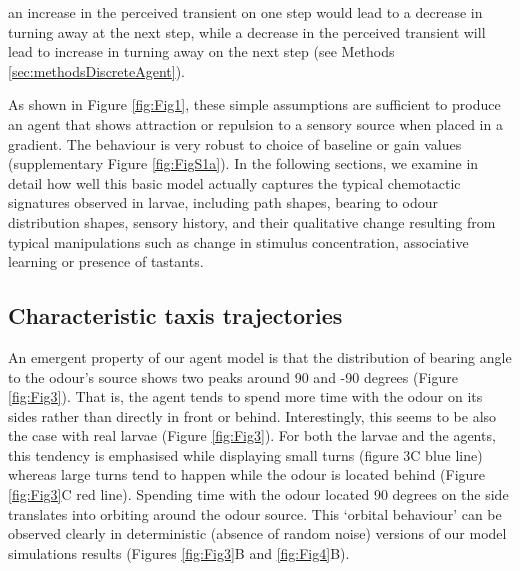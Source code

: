 \documentclass[10pt,a4paper]{article}
\begin{document}
\begin{itemize}
an increase in the perceived transient on one step would lead to a decrease in turning away at the next step, while a decrease in the perceived transient will lead to increase in turning away on the next step (see Methods \ref{sec:methodsDiscreteAgent}).
\end{itemize}

As shown in Figure \ref{fig:Fig1}, these simple assumptions are sufficient to produce an agent that shows attraction or repulsion
 to a sensory source when placed in a gradient.  The behaviour is very robust to choice of baseline or gain values (supplementary Figure \ref{fig:FigS1a}). In the following sections, we examine in detail how well this basic model actually captures the typical chemotactic signatures observed in larvae, including path shapes, bearing to odour distribution shapes, sensory history, and their qualitative change resulting from typical manipulations such as change in stimulus concentration, associative learning or presence of tastants.


\subsection{Characteristic taxis trajectories}
An emergent property of our agent model is that the distribution of bearing angle to the odour's source shows two peaks around 90 and -90 degrees (Figure \ref{fig:Fig3}). That is, the agent tends to spend more time with the odour on its sides rather than directly in front or behind. Interestingly, this seems to be also the case with real larvae (Figure \ref{fig:Fig3}). For both the larvae and the agents, this tendency is emphasised while displaying small turns (figure 3C blue line) whereas large turns tend to happen while the odour is located behind (Figure \ref{fig:Fig3}C red line). Spending time with the odour located 90 degrees on the side translates into orbiting around the odour source. This ‘orbital behaviour’ can be observed clearly in deterministic (absence of random noise) versions of our model simulations results (Figures \ref{fig:Fig3}B and \ref{fig:Fig4}B).
\end{document}
